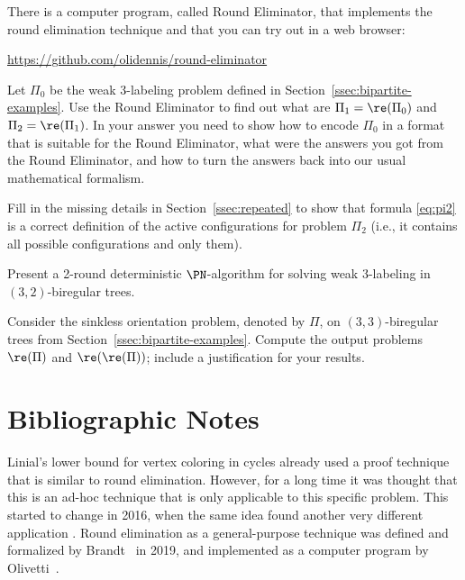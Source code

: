 \begin{ex}
	There is a computer program, called Round Eliminator, that implements the round elimination technique and that you can try out in a web browser:
	\begin{center}
		\url{https://github.com/olidennis/round-eliminator}
	\end{center}
	Let $\Pi_0$ be the weak 3-labeling problem defined in Section~\ref{ssec:bipartite-examples}. Use the Round Eliminator to find out what are $\Pi_1 = \re(\Pi_0)$ and $\Pi_2 = \re(\Pi_1)$. In your answer you need to show how to encode $\Pi_0$ in a format that is suitable for the Round Eliminator, what were the answers you got from the Round Eliminator, and how to turn the answers back into our usual mathematical formalism.
\end{ex}

\begin{ex}\label{ex:pi2}
	Fill in the missing details in Section~\ref{ssec:repeated} to show that formula \eqref{eq:pi2} is a correct definition of the active configurations for problem $\Pi_2$ (i.e., it contains all possible configurations and only them).
\end{ex}

\begin{ex}
	Present a 2-round deterministic $\PN$-algorithm for solving weak 3-labeling in $(3,2)$-biregular trees.
\end{ex}

\begin{ex}
	Consider the sinkless orientation problem, denoted by $\Pi$, on $(3,3)$-biregular trees from Section~\ref{ssec:bipartite-examples}. Compute the output problems $\re(\Pi)$ and $\re(\re(\Pi))$; include a justification for your results.
\end{ex}

\section{Bibliographic Notes}

Linial's \cite{linial92locality} lower bound for vertex coloring in cycles already used a proof technique that is similar to round elimination. However, for a long time it was thought that this is an ad-hoc technique that is only applicable to this specific problem. This started to change in 2016, when the same idea found another very different application \cite{brandt16lll}. Round elimination as a general-purpose technique was defined and formalized by Brandt~\cite{Brandt2019automatic} in 2019, and implemented as a computer program by Olivetti~\cite{Olivetti2019}.
